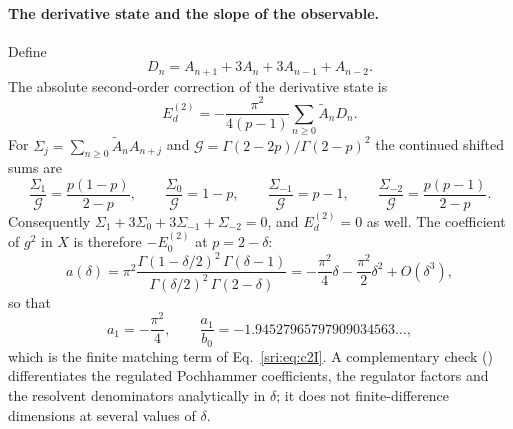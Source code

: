 \paragraph{The derivative state and the slope of the observable.} Define
\begin{equation}
 D_n=A_{n+1}+3A_n+3A_{n-1}+A_{n-2}.
\end{equation}
The absolute second-order correction of the derivative state is
\begin{equation}
 E_d^{(2)}=-\frac{\pi^2}{4(p-1)}\sum_{n\ge0}\tilde A_nD_n.
\end{equation}
For $\Sigma_j=\sum_{n\ge0}\tilde A_nA_{n+j}$ and $\mathcal G=\Gamma(2-2p)/\Gamma(2-p)^2$ the continued shifted
sums are
\begin{equation}
 \frac{\Sigma_1}{\mathcal G}=\frac{p(1-p)}{2-p},\qquad
 \frac{\Sigma_0}{\mathcal G}=1-p,\qquad
 \frac{\Sigma_{-1}}{\mathcal G}=p-1,\qquad
 \frac{\Sigma_{-2}}{\mathcal G}=\frac{p(p-1)}{2-p}.
\end{equation}
Consequently $\Sigma_1+3\Sigma_0+3\Sigma_{-1}+\Sigma_{-2}=0$, and $E_d^{(2)}=0$ as well. The
coefficient of $g^2$ in $X$ is therefore $-E_0^{(2)}$ at $p=2-\delta$:
\begin{equation}
 a(\delta)=\pi^2\frac{\Gamma(1-\delta/2)^2\,\Gamma(\delta-1)}{\Gamma(\delta/2)^2\,\Gamma(2-\delta)}
 =-\frac{\pi^2}{4}\delta-\frac{\pi^2}{2}\delta^2+O(\delta^3),
 \label{sri:eq:cyl:adelta}
\end{equation}
so that
\begin{equation}
 a_1=-\frac{\pi^2}{4},\qquad \frac{a_1}{b_0}=-1.94527965797909034563\ldots,
\end{equation}
which is the finite matching term of Eq.~\eqref{sri:eq:c2I}. A complementary check
() differentiates the regulated Pochhammer coefficients,
the regulator factors and the resolvent denominators analytically in $\delta$; it does not finite-difference dimensions
at several values of $\delta$.

